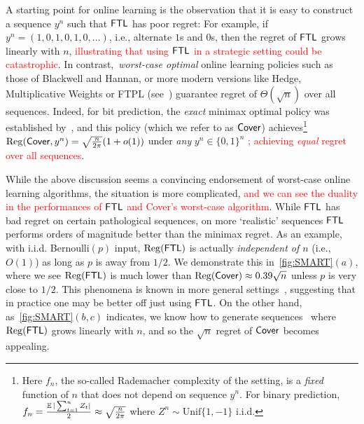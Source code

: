 A starting point for online learning is the observation that it is easy to construct a sequence $y^n$ such that $\mathsf{FTL}$ has poor regret: For example, if $y^n = (1,0,1,0,1,0,\ldots)$, i.e., alternate $1$s and $0$s, then the regret of $\mathsf{FTL}$ grows linearly with $n$, \textcolor{red}{illustrating that using $\mathsf{FTL}$ in a strategic setting could be catastrophic}. In contrast,~\emph{worst-case optimal} online learning policies such as those of Blackwell and Hannan, or more modern versions like Hedge, Multiplicative Weights or FTPL (see~\cite{Cesa-Bianchi--Lugosi2006,slivkins2019introduction}) guarantee regret of $\Theta(\sqrt{n})$ over all sequences. Indeed, for bit prediction, the \emph{exact} minimax optimal policy was established by~\cite{Cover1966}, and this policy (which we refer to as $\mathsf{Cover}$) achieves\footnote{Here $f_n$, the so-called Rademacher complexity of the setting, is a \emph{fixed} function of $n$ that does not depend on sequence $y^n$. For binary prediction, $f_n = \frac{\operatorname{\mathbb{E}}|\sum_{t=1}^n Z_t|}{2} \approx \sqrt{\frac{n}{2\pi}}$ where $Z^n \sim \mathrm{Unif}\{1,-1\}$ i.i.d.}  $\mathrm{Reg}(\mathsf{Cover}, y^n) = \sqrt{\frac{n}{2\pi}}(1+o(1))$ under \emph{any} $y^n \in\{0,1\}^n$ \textcolor{red}{; achieving \emph{equal} regret over all sequences}.

While the above discussion seems a convincing endorsement of worst-case online learning algorithms, the situation is more complicated, \textcolor{red}{and we can see the duality in the performances of $\mathsf{FTL}$ and Cover's worst-case algorithm}. While $\mathsf{FTL}$ has bad regret on certain pathological sequences, on more `realistic' sequences $\mathsf{FTL}$ performs orders of magnitude better than the minimax regret. As an example, with i.i.d. Bernoulli$(p)$ input, $\mathrm{Reg}(\mathsf{FTL})$ is actually \emph{independent of $n$} (i.e., $O(1)$) as long as $p$ is away from $1/2$. We demonstrate this in~\cref{fig:SMART}$(a)$, where we see $\mathrm{Reg}(\mathsf{FTL})$ is much lower than $\mathrm{Reg}(\mathsf{Cover})\approx 0.39\sqrt{n}$ unless $p$ is very close to $1/2$. This phenomena is known in more general settings~\citep{Huang--Lattimore--Gyorgy--Szapesvari2016}, suggesting that in practice one may be better off just using $\mathsf{FTL}$. On the other hand, as~\cref{fig:SMART}$(b,c)$ indicates, we know how to generate sequences~\citep{feder1992universal} where $\mathrm{Reg}(\mathsf{FTL})$ grows linearly with $n$, and so the $\sqrt{n}$ regret of $\mathsf{Cover}$ becomes appealing. 

